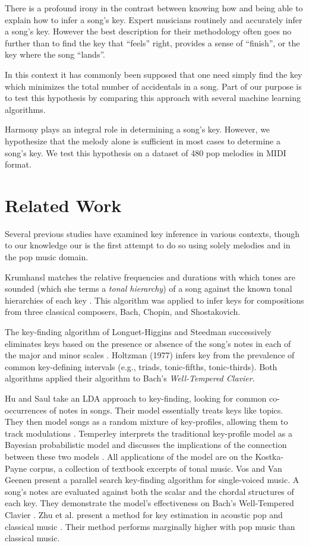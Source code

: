 \documentclass[letterpaper]{article}
\begin{document}
There is a profound irony in the contrast between knowing how and being able to explain how to infer a song's key. Expert musicians routinely and accurately infer a song's key. However the best description for their methodology often goes no further than to find the key that ``feels'' right, provides a sense of ``finish'', or the key where the song ``lands''.

In this context it has commonly been supposed that one need simply find the key which minimizes the total number of accidentals in a song. Part of our purpose is to test this hypothesis by comparing this approach with several machine learning algorithms.

Harmony plays an integral role in determining a song's key. However, we hypothesize that the melody alone is sufficient in most cases to determine a song's key. We test this hypothesis on a dataset of 480 pop melodies in MIDI format.

\section{Related Work}

Several previous studies have examined key inference in various contexts, though to our knowledge our is the first attempt to do so using solely melodies and in the pop music domain.

Krumhansl matches the relative frequencies and durations with which tones are sounded (which she terms a \emph{tonal hierarchy}) of a song against the known tonal hierarchies of each key \cite{krumhansl2001cognitive}. This algorithm was applied to infer keys for compositions from three classical composers, Bach, Chopin, and Shostakovich. 

The key-finding algorithm of Longuet-Higgins and Steedman successively eliminates keys based on the presence or absence of the song's notes in each of the major and minor scales \cite{longuet1971interpreting}. Holtzman (1977) infers key from the prevalence of common key-defining intervals (e.g., triads, tonic-fifths, tonic-thirds). Both algorithms applied their algorithm to Bach's \emph{Well-Tempered Clavier}.

Hu and Saul take an LDA approach to key-finding, looking for common co-occurrences of notes in songs. Their model essentially treats keys like topics. They then model songs as a random mixture of key-profiles, allowing them to track modulations \cite{hu2009probabilistic}. Temperley interprets the traditional key-profile model as a Bayesian probabilistic model and discusses the implications of the connection between these two models \cite{temperley2002bayesian}. All applications of the model are on the Kostka-Payne corpus, a collection of textbook excerpts of tonal music. Vos and Van Geenen present a parallel search key-finding algorithm for single-voiced music. A song's notes are evaluated against both the scalar and the chordal structures of each key. They demonstrate the model's effectiveness on Bach's Well-Tempered Clavier \cite{vos1996parallel}. Zhu et al. present a method for key estimation in acoustic pop and classical music \cite{zhu2005music}. Their method performs marginally higher with pop music than classical music. 
\end{document}
